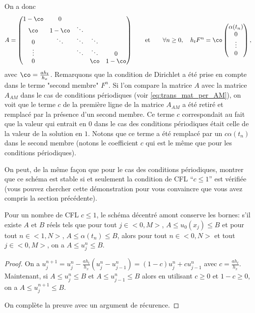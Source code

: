 \documentclass[12pt,a4paper,twoside]{article}
\begin{document}
On a donc 
\begin{align}
  A =
  \begin{pmatrix}
    1 - \co & 0 & & &
    \\
    \co & 1 - \co & \ddots & &
    \\
    0 & \ddots & \ddots & \ddots &
    \\
    \vdots & & \ddots & \ddots & 0
    \\
    0 & & & \co & 1-\co
  \end{pmatrix}
  \qquad \text{et} \qquad
  \forall n \geq 0,
  \quad h_t F^n = \co
  \begin{pmatrix}
    \alpha(t_n)
    \\
    0
    \\
    \vdots
    \\
    0
  \end{pmatrix}
  ,
\end{align}
avec $\co = \frac{a h_t}{h_x}$.
Remarquons que la condition de Dirichlet a \'et\'e prise en compte
dans le terme "second membre" $F^n$.
Si l'on compare la matrice $A$ avec la matrice $A_{AM}$ dans le cas de conditions
p\'eriodiques (voir \eqref{eq:trans_mat_per_AM}), on voit que le terme $c$
de la premi\`ere ligne de
la matrice $A_{AM}$ a \'et\'e retir\'e et remplac\'e par la pr\'esence d'un second
membre.
Ce terme $c$ correspondait au fait que la valeur qui entrait en $0$ dans le cas des conditions
p\'eriodiques \'etait celle de la valeur de la solution en $1$.
Notons que ce terme a \'et\'e remplac\'e par un $c \alpha(t_n)$ dans le second membre
(notons le coefficient $c$ qui est le m\^eme que pour les conditions p\'eriodiques).


On peut, de la m\^eme fa\c{c}on que pour le cas des conditions p\'eriodiques, 
montrer que ce sch\'ema est stable si et seulement la condition de CFL ``$c \leq 1$''
est v\'erifi\'ee (vous pouvez chercher cette d\'emonstration pour vous convaincre
que vous avez compris la section pr\'ec\'edente).


\begin{proposition}
  Pour un nombre de CFL $c \leq 1$,
  le sch\'ema d\'ecentr\'e amont conserve les bornes:
  s'il existe $A$ et $B$ r\'eels tels que
  pour tout $j \in < 0 , M>$, $A \leq u_0(x_j) \leq B$
  et pour tout $n \in < 1 , N >$, $A \leq \alpha(t_n) \leq B$,
  alors pour tout $n \in < 0 , N >$ et tout $j \in <0,M>$,
  on a $A \leq u_j^n \leq B$.
\end{proposition}

\begin{proof}
  On a $u_j^{n+1} = u_j^n - \frac{a h_t}{h_x} (u_j^n - u_{j-1}^n) = (1-c) u_j^n + c u_{j-1}^n$
  avec $c = \frac{a h_t}{h_x}$.
  Maintenant, si $A \leq u_j^{n} \leq B$ et $A \leq u_{j-1}^n \leq B$ alors
  en utilisant $c \geq 0$ et $1-c \geq 0$, on a
  $A \leq u_j^{n+1} \leq B$.

  On compl\`ete la preuve avec un argument de r\'ecurence.
\end{proof}
\end{document}
